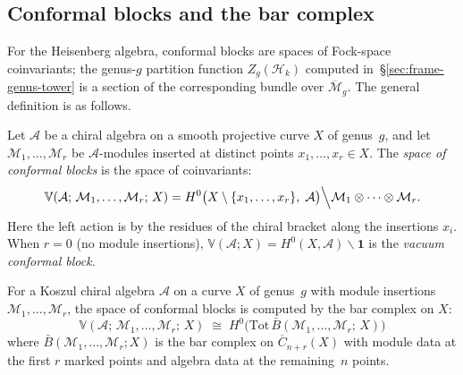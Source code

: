 \subsection{Conformal blocks and the bar complex}
\label{sec:conformal-blocks}

\begin{definition}
\label{def:conformal-blocks}
For the Heisenberg algebra, conformal blocks are spaces of Fock-space coinvariants; the genus-$g$ partition function $Z_g(\mathcal{H}_k)$ computed in~\S\ref{sec:frame-genus-tower} is a section of the corresponding bundle over $\overline{\mathcal{M}}_g$.  The general definition is as follows.

Let $\mathcal{A}$ be a chiral algebra on a smooth projective
curve $X$ of genus~$g$, and let
$\mathcal{M}_1, \ldots, \mathcal{M}_r$ be $\mathcal{A}$-modules
inserted at distinct points $x_1, \ldots, x_r \in X$.  The
\emph{space of conformal blocks} is the space of coinvariants:
\begin{equation}\label{eq:conformal-blocks}
\mathbb{V}(\mathcal{A};\, \mathcal{M}_1, \ldots, \mathcal{M}_r;\, X)
= H^0\bigl(
  X \setminus \{x_1, \ldots, x_r\},\;
  \mathcal{A} \bigr) \Big\backslash
  \mathcal{M}_1 \otimes \cdots \otimes \mathcal{M}_r.
\end{equation}
Here the left action is by the residues of the chiral bracket
along the insertions $x_i$.  When $r = 0$ (no module insertions),
$\mathbb{V}(\mathcal{A}; X) = H^0(X, \mathcal{A}) \backslash
\mathbf{1}$ is the \emph{vacuum conformal block}.
\end{definition}

\begin{proposition}
\label{prop:conformal-blocks-bar}
For a Koszul chiral algebra $\mathcal{A}$ on a curve $X$ of
genus~$g$ with module insertions
$\mathcal{M}_1, \ldots, \mathcal{M}_r$, the space of conformal
blocks is computed by the bar complex on $X$:
\begin{equation}\label{eq:conformal-blocks-bar}
\mathbb{V}(\mathcal{A};\, \mathcal{M}_1, \ldots, \mathcal{M}_r;\, X)
\;\cong\;
H^0\bigl(
  \mathrm{Tot}\,
  \bar{B}(\mathcal{M}_1, \ldots, \mathcal{M}_r;\, X)
\bigr)
\end{equation}
where $\bar{B}(\mathcal{M}_1, \ldots, \mathcal{M}_r; X)$ is the
bar complex on $\overline{C}_{n+r}(X)$ with module data at the
first $r$ marked points and algebra data at the remaining~$n$
points.
\end{proposition}

